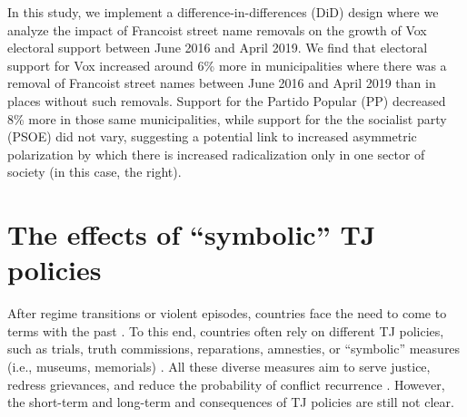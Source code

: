 \documentclass[12pt, notitlepage]{article}
\begin{document}
In this study, we implement a difference-in-differences (DiD) design where we analyze the impact of Francoist street name removals on the growth of Vox electoral support between June 2016 and April 2019.
We find that electoral support for Vox increased around 6\% more in municipalities where there was a removal of Francoist street names between June 2016 and April 2019 than in places without such removals. Support for the Partido Popular (PP) decreased 8\% more in those same municipalities, while support for the the socialist party (PSOE) did not vary, suggesting a potential link to increased asymmetric polarization by which there is increased radicalization only in one sector of society (in this case, the right).


\section*{The effects of ``symbolic'' TJ policies}

After regime transitions or violent episodes, countries face the need to come to terms with the past \citep{Elster:2004aa}. To this end, countries often rely on different TJ policies, such as trials, truth commissions, reparations, amnesties, or ``symbolic'' measures (i.e., museums, memorials) \citep{De-Brito:2001aa, Elster:2004aa, Balasco:2013aa}. All these diverse measures aim to serve justice, redress grievances, and reduce the probability of conflict recurrence \citep{Loyle:2017aa}. However, the short-term and long-term and consequences of TJ policies are still not clear.
\end{document}
